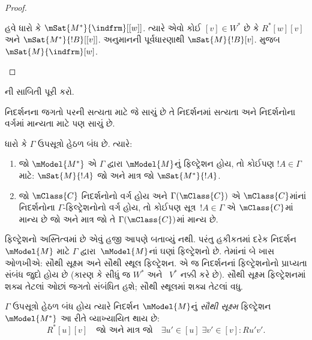 \begin{proof}
\begin{enumerate}
{          હવે ધારો કે $\mSat{M^*}{\indfrm}[{[w]}]$.
          ત્યારે એવો કોઈ $[v] \in W^*$ છે કે $R^*[w][v]$ અને
          $\mSat{M^*}{!B}[{[v]}]$. અનુમાનની પૂર્વધારણાથી
          $\mSat{M}{!B}[v]$.
           મુજબ
          $\mSat{M}{\indfrm}[w]$.}
  \end{enumerate}
\end{proof}

\begin{prob}
  ની સાબિતી પૂરી કરો.
\end{prob}

નિદર્શનના જગતો પરની સત્યતા માટે જે સાચું છે તે નિદર્શનમાં સત્યતા
અને નિદર્શનોના વર્ગમાં માન્યતા માટે પણ સાચું છે.

\begin{cor}
  ધારો કે $\Gamma$ ઉપસૂત્રો હેઠળ બંધ છે. ત્યારે:
  \begin{enumerate}
  \item જો $\mModel{M^*}$ એ $\Gamma$ દ્વારા $\mModel{M}$નું
    ફિલ્ટ્રેશન હોય, તો કોઈપણ $!A \in \Gamma$ માટે:
    $\mSat{M}{!A}$ જો અને માત્ર જો $\mSat{M^*}{!A}$.
  \item જો $\mClass{C}$ નિદર્શનોનો વર્ગ હોય અને
    $\Gamma(\mClass{C})$ એ $\mClass{C}$માંનાં નિદર્શનોના
    $\Gamma$-ફિલ્ટ્રેશનોનો વર્ગ હોય, તો કોઈપણ
    સૂત્ર~$!A \in \Gamma$ એ $\mClass{C}$માં માન્ય છે
    જો અને માત્ર જો તે $\Gamma(\mClass{C})$માં માન્ય છે.
  \end{enumerate}
\end{cor}
\endgroup

\begingroup
\makeatletter{}\makeatother


\label{guunit:OLP-0454}


ફિલ્ટ્રેશનો અસ્તિત્વમાં છે એવું હજી આપણે બતાવ્યું નથી. પરંતુ હકીકતમાં
દરેક નિદર્શન $\mModel{M}$ માટે $\Gamma$ દ્વારા~$\mModel{M}$નાં
ઘણાં ફિલ્ટ્રેશનો છે. તેમાંનાં બે ખાસ ઓળખીએ: સૌથી સૂક્ષ્મ અને સૌથી
સ્થૂલ ફિલ્ટ્રેશન. એ જ નિદર્શનનાં ફિલ્ટ્રેશનોનો પ્રાપ્યતા સંબંધ જુદો
હોય છે (કારણ કે  સીધું જ $W^*$ અને
~$V^*$ નક્કી કરે છે). સૌથી સૂક્ષ્મ ફિલ્ટ્રેશનમાં શક્ય તેટલાં ઓછાં
જગતો સંબંધિત હશે; સૌથી સ્થૂલમાં શક્ય તેટલાં વધુ.

\begin{defn}
  $\Gamma$ ઉપસૂત્રો હેઠળ બંધ હોય ત્યારે નિદર્શન $\mModel{M}$નું
  \emph{સૌથી સૂક્ષ્મ} ફિલ્ટ્રેશન $\mModel{M^*}$ આ રીતે વ્યાખ્યાયિત
  થાય છે:
  \[
  R^*[u][v] \quad \text{જો અને માત્ર જો} \quad \exists u'\in [u] \;
  \exists v' \in [v] : Ru'v'.
  \]
\end{defn}

